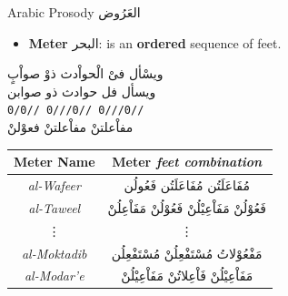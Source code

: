 \documentclass[10pt]{beamer}
\begin{document}
\begin{frame}[fragile]{Arabic Prosody \textarabic{العَرُوض}}

\begin{itemize}
  \item \textbf{Meter} \textarabic{البحر}: is an \textbf{ordered} sequence of \alert{feet}. 
\end{itemize}



\begin{center}
  \textarabic{ويسْأل فىْ الْحواْدث ذوْ صواْبٍ}\\
  \textarabic{ويسأل فل \hspace{0.4cm}
    حوادث ذو\hspace{0.4cm}
    صوابن}\\
  \texttt{0/0//     \hspace{0.3cm}
          0///0//   \hspace{0.3cm}
          0///0//}\\

  \textarabic{مفاْعلتنْ\hspace{0.7cm} 
    مفاْعلتنْ          \hspace{0.7cm}
    فعوْلنْ}
\end{center}


\begin{center}
  \begin{tabular}[h!]{|c|c|} 
    \hline
    \textbf{Meter Name} & \textbf{Meter} \small{\textit{feet combination}} \\ 
    \hline
   \textit{al-Wafeer}    & \textarabic{مُفَاعَلَتُن مُفَاعَلَتُن فَعُولُن} \\ %
   \textit{al-Taweel}    & \textarabic{فَعُوْلُنْ مَفَاْعِيْلُنْ فَعُوْلُنْ مَفَاْعِلُنْ} \\ %
   \vdots                &  \vdots\\
   \textit{al-Moktadib}  & \textarabic{مَفْعُوْلاتُ مُسْتَفْعِلُنْ مُسْتَفْعِلُن} \\
   \textit{al-Modar'e}   & \textarabic{مَفَاْعِيْلُنْ فَاْعِلاتُنْ مَفَاْعِيْلُنْ} \\
    \hline
  \end{tabular}
\end{center}
\end{frame}
\end{document}
